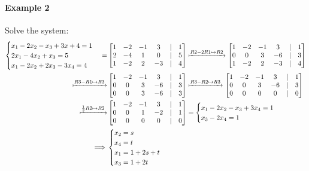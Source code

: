 \paragraph*{Example 2} Solve the system:
\begin{align*}
    \begin{cases}
        x_1 - 2x_2 - x_3 + 3x+4 = 1 \\
        2x_1 - 4x_2 + x_3 = 5 \\
        x_1 - 2x_2 + 2x_3 -3x_4 = 4 \\
    \end{cases} = & \begin{bmatrix}
        1 & -2 & -1 & 3 & | & 1 \\
        2 & -4 & 1 & 0 & | & 5 \\
        1 & -2 & 2 & -3 & | & 4 \\
    \end{bmatrix} \xmapsto{R2 - 2R1 \mapsto R2} \begin{bmatrix}
        1 & -2 & -1 & 3 & | & 1 \\
        0 & 0 & 3 & -6 & | & 3 \\
        1 & -2 & 2 & -3 & | & 4 \\
    \end{bmatrix} \\
    \xmapsto{R3 - R1 \mapsto R3} & \begin{bmatrix}
        1 & -2 & -1 & 3 & | & 1 \\
        0 & 0 & 3 & -6 & | & 3 \\
        0 & 0 & 3 & -6 & | & 3 \\
    \end{bmatrix} \xmapsto{R3 - R2 \mapsto R3} \begin{bmatrix}
        1 & -2 & -1 & 3 & | & 1 \\
        0 & 0 & 3 & -6 & | & 3 \\
        0 & 0 & 0 & 0 & | & 0 \\
    \end{bmatrix} \\
    \xmapsto{\frac{1}{3}R2 \mapsto R2} &\begin{bmatrix}
        1 & -2 & -1 & 3 & | & 1 \\
        0 & 0 & 1 & -2 & | & 1 \\
        0 & 0 & 0 & 0 & | & 0 \\
    \end{bmatrix} = \begin{cases}
        x_1 - 2x_2 - x_3 + 3x_4 = 1 \\
        x_3 - 2x_4 = 1 \\
    \end{cases} \\
    \implies & \begin{cases}
        x_2 = s \\
        x_4 = t \\
        x_1 = 1 + 2s + t \\
        x_3 = 1 + 2t \\
    \end{cases}
\end{align*}


